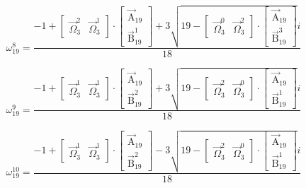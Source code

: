 \documentclass{article}
\begin{document}
\[ \omega_{19}^{8}=\frac{-1+\left[ \begin{matrix} \vec{\Omega}_{3}^{2} & \vec{\Omega}_{3}^{1} \end{matrix} \right]\cdot\left[ \begin{matrix} \vec{\mathrm{A}}_{19} \\ \vec{\mathrm{B}}_{19}^{1} \end{matrix} \right]+3\sqrt{19-\left[ \begin{matrix} \vec{\Omega}_{3}^{0} & \vec{\Omega}_{3}^{2} \end{matrix} \right]\cdot\left[ \begin{matrix} \vec{\mathrm{A}}_{19} \\ \vec{\mathrm{B}}_{19}^{3} \end{matrix} \right]}i}{18} \]

\[ \omega_{19}^{9}=\frac{-1+\left[ \begin{matrix} \vec{\Omega}_{3}^{1} & \vec{\Omega}_{3}^{1} \end{matrix} \right]\cdot\left[ \begin{matrix} \vec{\mathrm{A}}_{19} \\ \vec{\mathrm{B}}_{19}^{2} \end{matrix} \right]+3\sqrt{19-\left[ \begin{matrix} \vec{\Omega}_{3}^{2} & \vec{\Omega}_{3}^{0} \end{matrix} \right]\cdot\left[ \begin{matrix} \vec{\mathrm{A}}_{19} \\ \vec{\mathrm{B}}_{19}^{1} \end{matrix} \right]}i}{18} \]

\[ \omega_{19}^{10}=\frac{-1+\left[ \begin{matrix} \vec{\Omega}_{3}^{1} & \vec{\Omega}_{3}^{1} \end{matrix} \right]\cdot\left[ \begin{matrix} \vec{\mathrm{A}}_{19} \\ \vec{\mathrm{B}}_{19}^{2} \end{matrix} \right]-3\sqrt{19-\left[ \begin{matrix} \vec{\Omega}_{3}^{2} & \vec{\Omega}_{3}^{0} \end{matrix} \right]\cdot\left[ \begin{matrix} \vec{\mathrm{A}}_{19} \\ \vec{\mathrm{B}}_{19}^{1} \end{matrix} \right]}i}{18} \]
\end{document}
